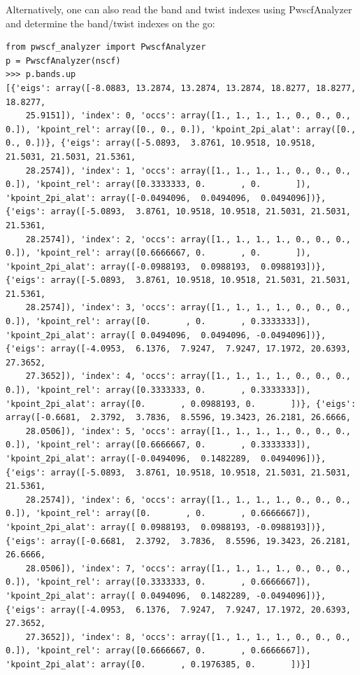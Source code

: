 Alternatively, one can also read the band and twist indexes using PwscfAnalyzer and determine the band/twist indexes on the go:
\begin{lstlisting}
from pwscf_analyzer import PwscfAnalyzer
p = PwscfAnalyzer(nscf)
>>> p.bands.up
[{'eigs': array([-8.0883, 13.2874, 13.2874, 13.2874, 18.8277, 18.8277, 18.8277,
	25.9151]), 'index': 0, 'occs': array([1., 1., 1., 1., 0., 0., 0., 0.]), 'kpoint_rel': array([0., 0., 0.]), 'kpoint_2pi_alat': array([0., 0., 0.])}, {'eigs': array([-5.0893,  3.8761, 10.9518, 10.9518, 21.5031, 21.5031, 21.5361,
	28.2574]), 'index': 1, 'occs': array([1., 1., 1., 1., 0., 0., 0., 0.]), 'kpoint_rel': array([0.3333333, 0.       , 0.       ]), 'kpoint_2pi_alat': array([-0.0494096,  0.0494096,  0.0494096])}, {'eigs': array([-5.0893,  3.8761, 10.9518, 10.9518, 21.5031, 21.5031, 21.5361,
	28.2574]), 'index': 2, 'occs': array([1., 1., 1., 1., 0., 0., 0., 0.]), 'kpoint_rel': array([0.6666667, 0.       , 0.       ]), 'kpoint_2pi_alat': array([-0.0988193,  0.0988193,  0.0988193])}, {'eigs': array([-5.0893,  3.8761, 10.9518, 10.9518, 21.5031, 21.5031, 21.5361,
	28.2574]), 'index': 3, 'occs': array([1., 1., 1., 1., 0., 0., 0., 0.]), 'kpoint_rel': array([0.       , 0.       , 0.3333333]), 'kpoint_2pi_alat': array([ 0.0494096,  0.0494096, -0.0494096])}, {'eigs': array([-4.0953,  6.1376,  7.9247,  7.9247, 17.1972, 20.6393, 27.3652,
	27.3652]), 'index': 4, 'occs': array([1., 1., 1., 1., 0., 0., 0., 0.]), 'kpoint_rel': array([0.3333333, 0.       , 0.3333333]), 'kpoint_2pi_alat': array([0.       , 0.0988193, 0.       ])}, {'eigs': array([-0.6681,  2.3792,  3.7836,  8.5596, 19.3423, 26.2181, 26.6666,
	28.0506]), 'index': 5, 'occs': array([1., 1., 1., 1., 0., 0., 0., 0.]), 'kpoint_rel': array([0.6666667, 0.       , 0.3333333]), 'kpoint_2pi_alat': array([-0.0494096,  0.1482289,  0.0494096])}, {'eigs': array([-5.0893,  3.8761, 10.9518, 10.9518, 21.5031, 21.5031, 21.5361,
	28.2574]), 'index': 6, 'occs': array([1., 1., 1., 1., 0., 0., 0., 0.]), 'kpoint_rel': array([0.       , 0.       , 0.6666667]), 'kpoint_2pi_alat': array([ 0.0988193,  0.0988193, -0.0988193])}, {'eigs': array([-0.6681,  2.3792,  3.7836,  8.5596, 19.3423, 26.2181, 26.6666,
	28.0506]), 'index': 7, 'occs': array([1., 1., 1., 1., 0., 0., 0., 0.]), 'kpoint_rel': array([0.3333333, 0.       , 0.6666667]), 'kpoint_2pi_alat': array([ 0.0494096,  0.1482289, -0.0494096])}, {'eigs': array([-4.0953,  6.1376,  7.9247,  7.9247, 17.1972, 20.6393, 27.3652,
	27.3652]), 'index': 8, 'occs': array([1., 1., 1., 1., 0., 0., 0., 0.]), 'kpoint_rel': array([0.6666667, 0.       , 0.6666667]), 'kpoint_2pi_alat': array([0.       , 0.1976385, 0.       ])}]
\end{lstlisting}

